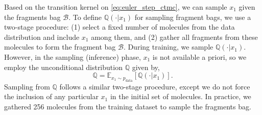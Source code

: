 Based on the transition kernel on \cref{eq:euler_step_ctmc}, we can sample $x_1$ given the fragments bag $\mathcal{B}$.
To define $\mathbb{Q}(\cdot\vert x_1)$ for sampling fragment bags, we use a two-stage procedure: (1) select a fixed number of molecules from the data distribution and include $x_1$ among them, and (2) gather all fragments from these molecules to form the fragment bag $\mathcal{B}$.
During training, we sample $\mathbb{Q}(\cdot \vert x_1)$. 
However, in the sampling (inference) phase, $x_1$ is not available a priori, so we employ the unconditional distribution $\mathbb{Q}$ given by,
\begin{equation}
    \mathbb{Q} = \mathbb{E}_{x_1\sim p_\text{data}}\left[ \mathbb{Q}(\cdot\vert x_1)\right].
\end{equation}
Sampling from $\mathbb{Q}$ follows a similar two-stage procedure, except we do not force the inclusion of any particular $x_1$ in the initial set of molecules.
In practice, we gathered 256 molecules from the training dataset to sample the fragments bag.

\begin{comment}
    ==========
    The $D$ dimensional joint variable $x_t^{1:D}$ is modeled with the follwing process,
    \begin{equation}
        \tilde{p}_{t+\Delta t|t} \left( x_{t+\Delta t}^{1:D} | x_t^{1:D}, \mathcal{B} \right) 
         = \prod_{d=1}^{D} 
         \left( \delta^{\mathcal{B}} \left( x_t^{(d)}, x_{t+\Delta t}^{(d)} \right) 
         + \mathbb{E}_{p_{1|t}^{(d)} 
         \left( x_1^{(d)} | x_t^{1:D}, \mathcal{B}\right)} \left [ R_t^{(d)} \left( x_t^{(d)}, x_{t+\Delta t}^{(d)} | x_1^{(d)}, \mathcal{B}\right) \right] \Delta t \right)
    \end{equation}
    To get access to the Euler step of the whole possible fragment types, we take the expectation over $\mathcal{B'} \sim \mathcal{P}(\cdot|z_t^{1:D})$ where $\mathcal{P}(\cdot|z_t^{1:D})$ denotes sampling types including the types $z_t^{1:D}$. 
    \begin{equation}
        \tilde{p}_{t+\Delta t|t} \left( z_{t+\Delta t}^{1:D} | z_t^{1:D} \right) = \mathbb{E} _ {\mathcal{B'} \sim \mathcal{P}(\cdot|z_t)} \tilde{p}_{t+\Delta t|t} \left( z_{t+\Delta t}^{1:D} | z_t^{1:D}, \mathcal{B'} \right)
    \end{equation}
    The loss is then
    \begin{equation}
        \mathcal{L}_\text{S-DFM} = \,
        \mathbb{E}_{t \sim \mathcal{U}[0,1],  \,
        (z_t, z_1) \sim p_{t|1}(\cdot, \cdot), \,
        \mathcal{B'} \sim \mathcal{P}(\cdot | z_t^{1:D})} \, 
        \left[- \sum_d \log \left( p_{1|t}^{(d)} (z_1^{(d)} | z_t^{1:D}, \mathcal{B'}; \theta) \right)\right],
    \end{equation}
\end{comment}


